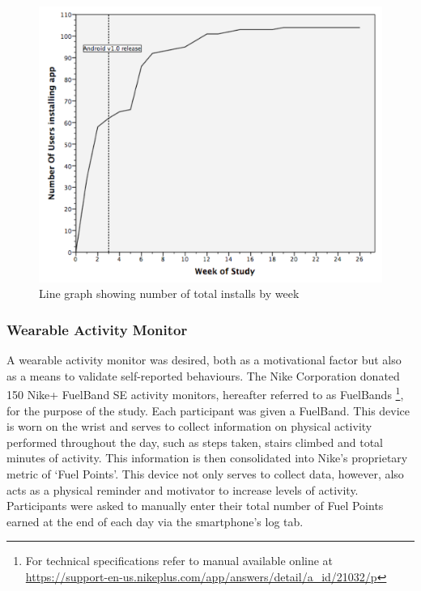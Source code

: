 \begin{figure}[h]
    \centering
    \includegraphics[scale=0.25, angle=0]{Files/prevention-study-3/figures/installs-by-week}
    \caption{Line graph showing number of total installs by week}
    \label{fig: number-installs}
\end{figure}

\subsubsection{Wearable Activity Monitor}
A wearable activity monitor was desired, both as a motivational factor but also as a means to validate self-reported behaviours. The Nike Corporation donated 150 Nike+ FuelBand SE activity monitors, hereafter referred to as FuelBands \footnote{For technical specifications refer to manual available online at \url{https://support-en-us.nikeplus.com/app/answers/detail/a_id/21032/p}}, for the purpose of the study. Each participant was given a FuelBand. This device is worn on the wrist and serves to collect information on physical activity performed throughout the day, such as steps taken, stairs climbed and total minutes of activity. This information is then consolidated into Nike's proprietary metric of ‘Fuel Points’. This device not only serves to collect data, however, also acts as a physical reminder and motivator to increase levels of activity. Participants were asked to manually enter their total number of Fuel Points earned at the end of each day via the smartphone’s log tab.

